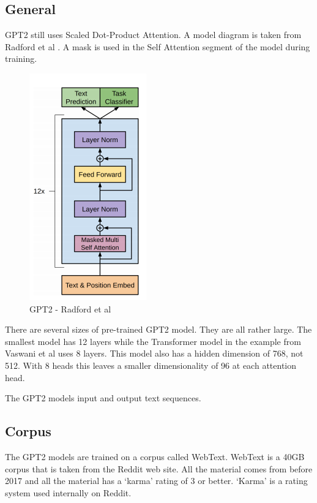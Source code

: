 \subsection{General}
GPT2 still uses Scaled Dot-Product Attention. A model diagram is taken from Radford et al \cite{radford2018improving}. A mask is used in the Self Attention segment of the model during training.

\begin{figure}[H]
	\begin{center}
		
		
		\includegraphics[scale=3.0]{diagram-mat05}
	\end{center}
	\caption[Generative Pre-training Transformer 2 ]{GPT2 - Radford et al \cite{radford2018improving}}
	

\end{figure}

There are several sizes of pre-trained GPT2 model. They are all rather large. The smallest model has 12 layers while the Transformer model in the example from Vaswani et al \cite{Vaswani2017AttentionIA} uses 8 layers. This model also has a hidden dimension of 768, not 512. With 8 heads this leaves a smaller dimensionality of 96 at each attention head. 

The GPT2 models input and output text sequences. %

\subsection{Corpus}
The GPT2 models are trained on a corpus called WebText. WebText is a 40GB corpus that is taken from the Reddit web site. All the material comes from before 2017 and all the material has a `karma' rating of 3 or better. `Karma' is a rating system used internally on Reddit. 

